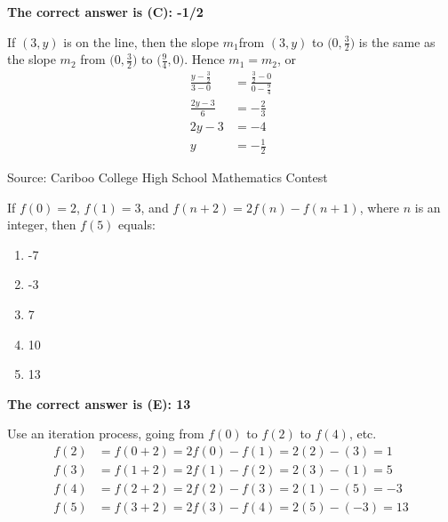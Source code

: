 \documentclass{article}
\begin{document}
\textbf{The correct answer is (C): -1/2}

If $(3,y)$ is on the line, then the slope $m_1$from $(3,y)$ to $\bigl(0,\frac{3}{2}\bigr)$ is the same as the slope $m_2$ from $\bigl(0,\frac{3}{2}\bigr)$ to $\bigl(\frac{9}{4},0\bigr)$. Hence $m_1=m_2$, or
\begin{align*}
\frac{y-\frac{3}{2}}{3-0} &= \frac{\frac{3}{2}-0}{0-\frac{9}{4}}\\
\frac{2y-3}{6} &= -\frac{2}{3}\\
2y-3&=-4\\
y&= -\frac{1}{2}
\end{align*}

\vskip 1.5cm


\scriptsize
Source: Cariboo College High School Mathematics Contest

\normalsize
If $f(0)=2$, $f(1)=3$, and $f(n+2)=2f(n)-f(n+1)$, where $n$ is an integer, then $f(5)$ equals:
\begin{enumerate}[noitemsep,topsep=0mm,leftmargin=*,widest=D,label=\Alph*)]
	\item -7
	\item -3
	\item 7
	\item 10
	\item 13
\end{enumerate}

\textbf{The correct answer is (E): 13}

Use an iteration process, going from $f(0)$ to $f(2)$ to $f(4)$, etc.
\begin{align*}
f(2) &= f(0+2) = 2f(0)-f(1) = 2(2) - (3) = 1\\
f(3) &= f(1+2) = 2f(1)-f(2) = 2(3) - (1) = 5\\
f(4) &= f(2+2) = 2f(2)-f(3) = 2(1)-(5) = -3\\
f(5) &= f(3+2) = 2f(3)-f(4) = 2(5)-(-3) = 13
\end{align*}

\vskip 1.5cm

\end{document}
